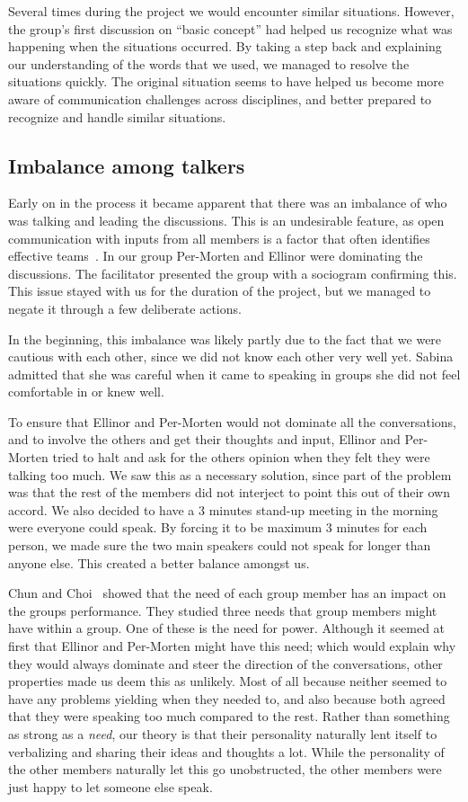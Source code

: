 Several times during the project we would encounter similar situations. However, the group’s first discussion on “basic concept” had helped us recognize what was happening when the situations occurred. By taking a step back and explaining our understanding of the words that we used, we managed to resolve the situations quickly. The original situation seems to have helped us become more aware of communication challenges across disciplines, and better prepared to recognize and handle similar situations.

\subsection{Imbalance among talkers}
Early on in the process it became apparent that there was an imbalance of who was talking and leading the discussions. This is an undesirable feature, as open communication with inputs from all members is a factor that often identifies effective teams~\cite{wheelan}. In our group Per-Morten and Ellinor were dominating the discussions. The facilitator presented the group with a sociogram confirming this.
This issue stayed with us for the duration of the project, but we managed to negate it through a few deliberate actions.

In the beginning, this imbalance was likely partly due to the fact that we were cautious with each other, since we did not know each other very well yet. Sabina admitted that she was careful when it came to speaking in groups she did not feel comfortable in or knew well. 

To ensure that Ellinor and Per-Morten would not dominate all the conversations, and to involve the others and get their thoughts and input, Ellinor and Per-Morten tried to halt and ask for the others opinion when they felt they were talking too much. We saw this as a necessary solution, since part of the problem was that the rest of the members did not interject to point this out of their own accord. We also decided to have a 3 minutes stand-up meeting in the morning were everyone could speak. By forcing it to be maximum 3 minutes for each person, we made sure the two main speakers could not speak for longer than anyone else. This created a better balance amongst us.      

Chun and Choi~\cite{2014chin_and_choi} showed that the need of each group member has an impact on the groups performance. They studied three needs that group members might have within a group. One of these is the need for power. Although it seemed at first that Ellinor and Per-Morten might have this need; which would explain why they would always dominate and steer the direction of the conversations, other properties made us deem this as unlikely. Most of all because neither seemed to have any problems yielding when they needed to, and also because both agreed that they were speaking too much compared to the rest. Rather than something as strong as a \textit{need}, our theory is that their personality naturally lent itself to verbalizing and sharing their ideas and thoughts a lot. While the personality of the other members naturally let this go unobstructed, the other members were just happy to let someone else speak.

